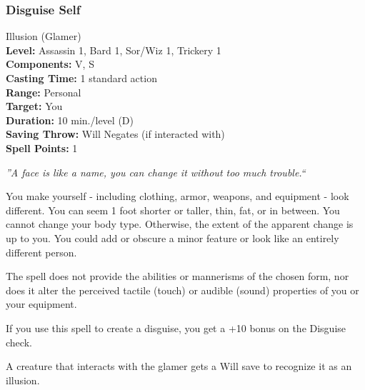 \subsubsection{Disguise Self}
\label{Spell:DisguiseSelf}
Illusion (Glamer)
\\ \textbf{Level:} Assassin 1, Bard 1, Sor/Wiz 1, Trickery 1
\\ \textbf{Components:} V, S
\\ \textbf{Casting Time:} 1 standard action
\\ \textbf{Range:} Personal
\\ \textbf{Target:} You
\\ \textbf{Duration:} 10 min./level (D)
\\ \textbf{Saving Throw:} Will Negates (if interacted with)
\\ \textbf{Spell Points:} 1

\emph{''A face is like a name, you can change it without too much trouble.``}

You make yourself - including clothing, armor, weapons, and equipment - look different. 
You can seem 1 foot shorter or taller, thin, fat, or in between. 
You cannot change your body type. Otherwise, the extent of the apparent change is up to you. 
You could add or obscure a minor feature or look like an entirely different person.

The spell does not provide the abilities or mannerisms of the chosen form, nor does it alter the perceived tactile (touch) or audible (sound) properties of you or your equipment.

If you use this spell to create a disguise, you get a +10 bonus on the Disguise check.

A creature that interacts with the glamer gets a Will save to recognize it as an illusion.

